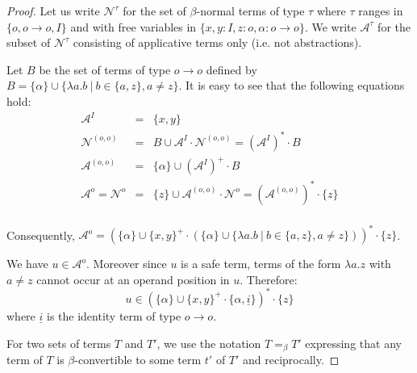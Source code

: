 \documentclass{llncs}
\newcommand\union{\cup}
\begin{document}
\begin{proof}
Let us write $\mathcal{N}^\tau$ for the set of $\beta$-normal terms of type $\tau$ where $\tau$ ranges in $\{ o, o\rightarrow o, I  \}$ and with free variables in $\{ x,y:I, z:o, \alpha:o\rightarrow o\}$. We write $\mathcal{A}^\tau$ for the subset of $\mathcal{N}^\tau$ consisting of applicative terms only (i.e. not abstractions).

Let $B$ be the set of terms of type $o\rightarrow o$ defined by $B = \{ \alpha \} \union \{ \lambda a.b \ | \ b \in \{a,z\}, a \neq z \}$.
It is easy to see that the following equations hold:
\begin{eqnarray*}
\mathcal{A}^I &=& \{ x,y \} \\
\mathcal{N}^{(o,o)} &=& B \union \mathcal{A}^I \cdot
\mathcal{N}^{(o,o)} = (\mathcal{A}^I)^* \cdot B \\
\mathcal{A}^{(o,o)} &=& \{ \alpha \} \union (\mathcal{A}^I)^+ \cdot B \\
\mathcal{A}^o = \mathcal{N}^o &=& \{ z \} \union \mathcal{A}^{(o,o)} \cdot \mathcal{N}^o = (\mathcal{A}^{(o,o)})^* \cdot \{ z \} \\
\end{eqnarray*}

Consequently, $\mathcal{A}^o = \left( \{\alpha \} \union \{x,y\}^+ \cdot \left( \{\alpha \} \union \{\lambda a.b \ | \ b \in \{a,z\}, a \neq z \} \right) \right)^* \cdot \{ z \}$.

We have $u \in \mathcal{A}^o$. Moreover since $u$ is a safe term,
terms of the form $\lambda a . z$ with $a \neq z$ cannot occur at an
operand position in $u$. Therefore:
\begin{equation}
u \in \left( \{\alpha\} \union \{x,y\}^+ \cdot \{\alpha,
\underline{i} \} \right)^* \cdot \{ z \} \label{eqn:u}
\end{equation}
where $\underline{i}$ is the identity term of type $o\rightarrow o$.

For two sets of terms $T$ and $T'$, we use the notation $T =_\beta T'$ expressing that any term of $T$ is $\beta$-convertible to some term $t'$ of $T'$ and reciprocally.


\end{proof}
\end{document}
